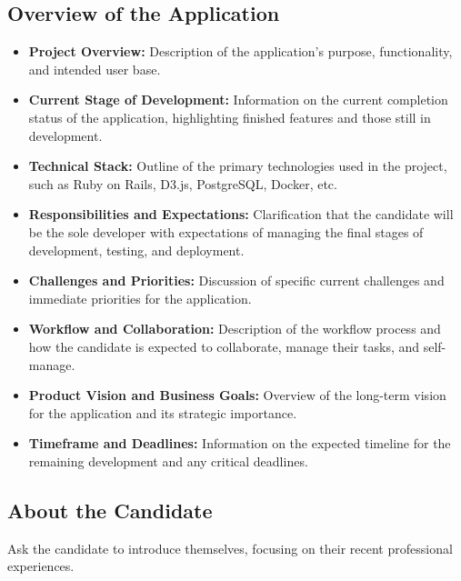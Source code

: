 \documentclass{article}
\begin{document}
\subsection*{Overview of the Application}
\begin{itemize}
    \item \textbf{Project Overview:} Description of the application's purpose, functionality, and intended user base.
    \item \textbf{Current Stage of Development:} Information on the current completion status of the application, highlighting finished features and those still in development.
    \item \textbf{Technical Stack:} Outline of the primary technologies used in the project, such as Ruby on Rails, D3.js, PostgreSQL, Docker, etc.
    \item \textbf{Responsibilities and Expectations:} Clarification that the candidate will be the sole developer with expectations of managing the final stages of development, testing, and deployment.
    \item \textbf{Challenges and Priorities:} Discussion of specific current challenges and immediate priorities for the application.
    \item \textbf{Workflow and Collaboration:} Description of the workflow process and how the candidate is expected to collaborate, manage their tasks, and self-manage.
    \item \textbf{Product Vision and Business Goals:} Overview of the long-term vision for the application and its strategic importance.
    \item \textbf{Timeframe and Deadlines:} Information on the expected timeline for the remaining development and any critical deadlines.
\end{itemize}

\subsection*{About the Candidate}
Ask the candidate to introduce themselves, focusing on their recent professional experiences.
\vspace{2in}
\end{document}

